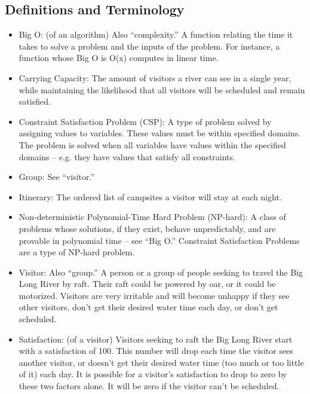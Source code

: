 \documentclass[11pt]{article} %
\begin{document}
\subsection{Definitions and Terminology}
\label{sec:defs}
\begin{itemize}
\item Big O: (of an algorithm) Also ``complexity.'' A function relating the
time it takes to solve a problem and the inputs of the problem. For instance,
a function whose Big O is O(x) computes in linear time.

\item Carrying Capacity: The amount of visitors a river can see in a single
year, while maintaining the likelihood that all visitors will be scheduled and
remain satisfied.

\item Constraint Satisfaction Problem (CSP): A type of problem solved by
assigning values to variables. These values must be within specified domains.
The problem is solved when all variables have values within the specified
domains -- e.g. they have values that satisfy all constraints.

\item Group: See ``visitor.''

\item Itinerary: The ordered list of campsites a visitor will stay at each
night.

\item Non-deterministic Polynomial-Time Hard Problem (NP-hard): A class of
problems whose solutions, if they exist, behave unpredictably, and are
provable in polynomial time -- see ``Big O.'' Constraint Satisfaction Problems
are a type of NP-hard problem.

\item Visitor: Also ``group.'' A person or a group of people
seeking to travel the Big Long River by raft. Their raft could be powered
by oar, or it could be motorized. Visitors are very irritable and will
become unhappy if they see other visitors, don't get their desired water
time each day, or don't get scheduled.

\item Satisfaction: (of a visitor) Visitors seeking to raft the Big Long River
start with a satisfaction of 100. This number will drop each time the visitor
sees another visitor, or doesn't get their desired water time (too much or
too little of it) each day. It is possible for a visitor's satisfaction to
drop to zero by these two factors alone. It will be zero if the visitor
can't be scheduled.


\end{itemize}
\end{document}
